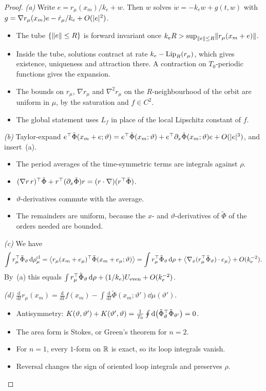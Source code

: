 \begin{proof}
\emph{(a)} Write $e = r_\mu(x_m)/k_e + w$. Then $w$ solves $\dot w = -k_e w + g(t,w)$ with
$g = \nabla r_\mu(x_m)e - \dot r_\mu/k_e + O(\lvert e\rvert^2)$.
\begin{itemize}
  \item The tube $\{\lVert e\rVert\le R\}$ is forward invariant once $k_eR > \sup_{\lVert e\rVert\le R}\lVert r_\mu(x_m+e)\rVert$.
  \item Inside the tube, solutions contract at rate $k_e - \operatorname{Lip}_R(r_\mu)$, which gives existence, uniqueness and
    attraction there. A contraction on $T_0$-periodic functions gives the expansion.
  \item The bounds on $r_\mu$, $\nabla r_\mu$ and $\nabla^2 r_\mu$ on the $R$-neighbourhood of the orbit are uniform in
    $\mu$, by the saturation and $f\in C^2$.
  \item The global statement uses $L_f$ in place of the local Lipschitz constant of $f$.
\end{itemize}

\noindent\emph{(b)} Taylor-expand
$e^\top\tilde\Phi(x_m+e;\vartheta) = e^\top\tilde\Phi(x_m;\vartheta) + e^\top\partial_x\tilde\Phi(x_m;\vartheta)e
+ O(\lvert e\rvert^3)$, and insert~(a).
\begin{itemize}
  \item The period averages of the time-symmetric terms are integrals against $\rho$.
  \item $(\nabla r\, r)^\top\tilde\Phi + r^\top(\partial_x\tilde\Phi)r = (r\cdot\nabla)(r^\top\tilde\Phi)$.
  \item $\vartheta$-derivatives commute with the average.
  \item The remainders are uniform, because the $x$- and $\vartheta$-derivatives of $\tilde\Phi$ of the orders needed
    are bounded.
\end{itemize}

\noindent\emph{(c)} We have
\[
  \int r_\mu^\top\tilde\Phi_\vartheta\,\mathrm{d}\rho^{\mathrm{cl}}_\mu
  = \bigl\langle r_\mu(x_m+e_\mu)^\top\tilde\Phi(x_m+e_\mu;\vartheta)\bigr\rangle
  = \int r_\mu^\top\tilde\Phi_\vartheta\,\mathrm{d}\rho
    + \bigl\langle\nabla_x(r_\mu^\top\tilde\Phi_\vartheta)\cdot e_\mu\bigr\rangle + O(k_e^{-2}).
\]
By~(a) this equals $\int r_\mu^\top\tilde\Phi_\vartheta\,\mathrm{d}\rho + (1/k_e)U_{\mathrm{even}} + O(k_e^{-2})$.

\noindent\emph{(d)} $\frac{\mathrm{d}}{\mathrm{d}t}r_\mu(x_m) = \frac{\mathrm{d}}{\mathrm{d}t}f(x_m)
- \int\frac{\mathrm{d}}{\mathrm{d}t}\tilde\Phi(x_m;\vartheta')\dd\mu(\vartheta')$.
\begin{itemize}
  \item Antisymmetry: $K(\vartheta,\vartheta') + K(\vartheta',\vartheta)
    = \frac{1}{T_0}\oint\mathrm{d}\bigl(\tilde\Phi_\vartheta^\top\tilde\Phi_{\vartheta'}\bigr) = 0$.
  \item The area form is Stokes, or Green's theorem for $n=2$.
  \item For $n=1$, every $1$-form on $\mathbb{R}$ is exact, so its loop integrals vanish.
  \item Reversal changes the sign of oriented loop integrals and preserves $\rho$.
\end{itemize}


\end{proof}
